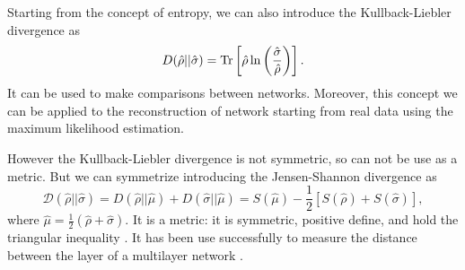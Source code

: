 Starting from the concept of entropy, we can also introduce the Kullback-Liebler divergence as
\begin{equation}\label{KL_divergence}
    D(\hat \rho || \hat \sigma) = \operatorname{Tr} \left[\hat \rho \ln\left(\frac{\hat\sigma}{\hat\rho}\right)\right].
\end{equation}
It can be used to make comparisons between networks. Moreover, this concept we can be applied to the reconstruction of network starting from real data using the maximum likelihood estimation.  

However the Kullback-Liebler divergence is not symmetric, so can not be use as a metric. 
But we can symmetrize introducing the Jensen-Shannon divergence as
\begin{equation}\label{JS_metric}
    \mathcal{D}(\hat\rho||\hat\sigma) = D(\hat \rho || \hat \mu) + D(\hat \sigma || \hat \mu) = S(\hat\mu)-\frac{1}{2}\left[S(\hat\rho) + S(\hat\sigma)\right],
\end{equation}
where $\hat\mu =\frac{1}{2}(\hat\rho+\hat\sigma)$. It is a metric: it is symmetric, positive define, and hold the triangular inequality \cite{Jensen-Shannon_divergence}. It has been use successfully to measure the distance between the layer of a multilayer network \cite{multilayer}.
